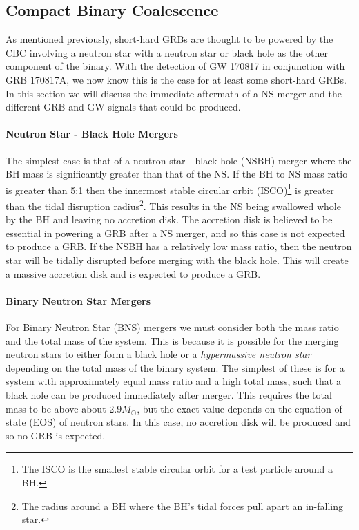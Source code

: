 \documentclass[11pt]{cuthesis}
\begin{document}
\subsection{Compact Binary Coalescence}
As mentioned previously, short-hard GRBs are thought to be powered by the CBC involving a neutron star with a neutron star or black hole as the other component of the binary. With the detection of GW 170817 in conjunction with GRB 170817A, we now know this is the case for at least some short-hard GRBs. In this section we will discuss the immediate aftermath of a NS merger and the different GRB and GW signals that could be produced.

\paragraph{Neutron Star - Black Hole Mergers} The simplest case is that of a neutron star - black hole (NSBH) merger where the BH mass is significantly greater than that of the NS. If the BH to NS mass ratio is greater than 5:1 then the innermost stable circular orbit (ISCO)\footnote{The ISCO is the smallest stable circular orbit for a test particle around a BH.} is greater than the tidal disruption radius\footnote{The radius around a BH where the BH's tidal forces pull apart an in-falling star.}. This results in the NS being swallowed whole by the BH and leaving no accretion disk. The accretion disk is believed to be essential in powering a GRB after a NS merger, and so this case is not expected to produce a GRB. If the NSBH has a relatively low mass ratio, then the neutron star will be tidally disrupted before merging with the black hole. This will create a massive accretion disk and is expected to produce a GRB. 

\paragraph{Binary Neutron Star Mergers} For Binary Neutron Star (BNS) mergers we must consider both the mass ratio and the total mass of the system. This is because it is possible for the merging neutron stars to either form a black hole or a \textit{hypermassive neutron star} depending on the total mass of the binary system. The simplest of these is for a system with approximately equal mass ratio and a high total mass, such that a black hole can be produced immediately after merger. This requires the total mass to be above about 2.9$M_\odot$\cite{gw_grb_paradigm}, but the exact value depends on the equation of state (EOS) of neutron stars. In this case, no accretion disk will be produced and so no GRB is expected. 
\end{document}
